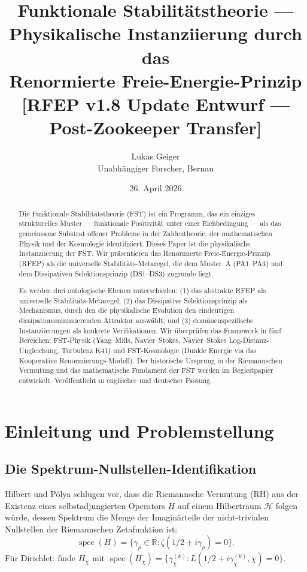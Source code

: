 \documentclass[11pt,a4paper]{article}
\title{Funktionale Stabilitätstheorie --- Physikalische Instanziierung durch das\\
Renormierte Freie-Energie-Prinzip\\
\vspace{0.3em}
{\large [RFEP v1.8 Update Entwurf --- Post-Zookeeper Transfer]}}
\author{Lukas Geiger\\
\small Unabhängiger Forscher, Bernau}
\date{26. April 2026}
\theoremstyle{plain}
\theoremstyle{definition}
\DeclareMathOperator{\spec}{spec}
\newcommand{\R}{\mathbb{R}}
\newcommand{\HH}{\mathcal{H}}
\newcommand{\chifn}{\chi}
\begin{document}
\maketitle

\begin{abstract}
Die Funktionale Stabilitätstheorie (FST) ist ein Programm, das ein einziges
strukturelles Muster --- funktionale Positivität unter einer Eichbedingung ---
als das gemeinsame Substrat offener Probleme in der Zahlentheorie, der mathematischen Physik
und der Kosmologie identifiziert. Dieses Paper ist die physikalische Instanziierung der FST.
Wir präsentieren das Renormierte Freie-Energie-Prinzip (RFEP) als die universelle Stabilitäts-Metaregel,
die dem Muster~A (PA1--PA3) und dem Dissipativen Selektionsprinzip (DS1--DS3) zugrunde liegt.

Es werden drei ontologische Ebenen unterschieden: (1) das abstrakte RFEP als
universelle Stabilitäts-Metaregel; (2) das Dissipative Selektionsprinzip
als Mechanismus, durch den die physikalische Evolution den eindeutigen
dissipationsminimierenden Attraktor auswählt; und (3) domänenspezifische
Instanziierungen als konkrete Verifikationen. Wir überprüfen das Framework
in fünf Bereichen: FST-Physik (Yang--Mills, Navier--Stokes, Navier--Stokes Log-Distanz-Ungleichung,
Turbulenz K41) und FST-Kosmologie (Dunkle Energie via das Kooperative Renormierungs-Modell).
Der historische Ursprung in der Riemannschen Vermutung und das mathematische Fundament
der FST werden im Begleitpapier \cite{ZetaZooMaster} entwickelt. Veröffentlicht in englischer und deutscher Fassung.
\end{abstract}

\tableofcontents

\section{Einleitung und Problemstellung}
\label{sec:intro}

\subsection{Die Spektrum-Nullstellen-Identifikation}

Hilbert und P\'olya schlugen vor, dass die Riemannsche Vermutung (RH) aus der
Existenz eines selbstadjungierten Operators $H$ auf einem Hilbertraum $\HH$ folgen würde,
dessen Spektrum die Menge der Imaginärteile der nicht-trivialen Nullstellen
der Riemannschen Zetafunktion ist:
\begin{equation}
  \spec(H) = \{\gamma_\rho \in \R : \zeta(1/2 + i\gamma_\rho) = 0\}.
\end{equation}
Für Dirichlet: finde $H_\chifn$ mit $\spec(H_\chifn) =
\{\gamma_\chifn^{(k)} : L(1/2 + i\gamma_\chifn^{(k)}, \chifn) = 0\}$.
\end{document}
